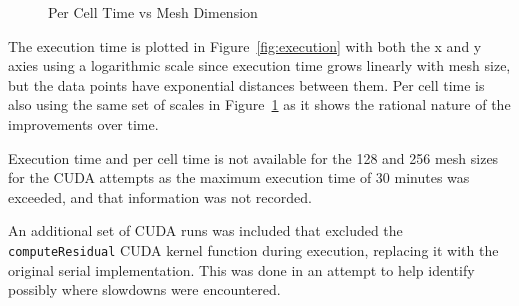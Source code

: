 \documentclass{article}
\begin{document}
  \begin{figure}[H]
    \centering
    \caption{Per Cell Time vs Mesh Dimension}
    \label{fig:percell}
  \end{figure}

  The execution time is plotted in Figure~\ref{fig:execution} with both the
  x and y axies using a logarithmic scale since execution time grows linearly
  with mesh size, but the data points have exponential distances between them. 
  Per cell time is also using the same set of scales in 
  Figure~\ref{fig:percell} as it shows the rational nature of the improvements 
  over time.

  Execution time and per cell time is not available for the 128 and 256 mesh
  sizes for the CUDA attempts as the maximum execution time of 30 minutes was
  exceeded, and that information was not recorded.

  An additional set of CUDA runs was included that excluded the 
  \verb|computeResidual| CUDA kernel function during execution, replacing it
  with the original serial implementation. This was done in an attempt to help
  identify possibly where slowdowns were encountered.
\end{document}
